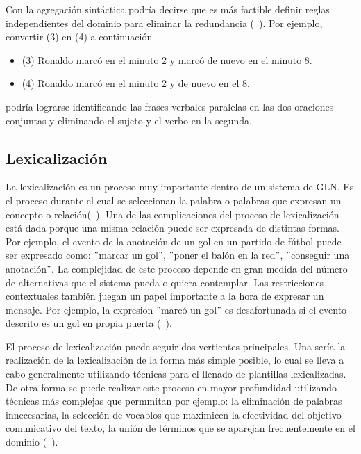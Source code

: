     Con la agregación sintáctica podría decirse que es más factible definir reglas independientes del dominio para eliminar la 
redundancia (~\cite{Gatt2018SurveyOT}). Por ejemplo, convertir (3) en (4) a continuación

\begin{itemize}
    \item (3) Ronaldo marcó en el minuto 2 y marcó de nuevo en el minuto 8.
    \item (4) Ronaldo marcó en el minuto 2 y de nuevo en el 8.
\end{itemize}
    
podría lograrse identificando las frases verbales paralelas en las dos oraciones conjuntas y eliminando el sujeto y el verbo en la segunda.

\subsection{Lexicalización}\label{subsection:lexicalizacion}

    La lexicalización es un proceso muy importante dentro de un sistema de GLN. Es el proceso durante el cual se 
seleccionan la palabra o palabras que expresan un concepto o relaci\'on(~\cite{Reiter1997BuildingAN}). Una de las 
complicaciones del proceso de lexicalización est\'a dada porque una misma relación puede ser expresada de 
distintas formas. Por ejemplo, el evento de la anotación de un gol en un partido de fútbol puede ser expresado como:
¨marcar un gol¨, ¨poner el balón en la red¨, ¨conseguir una anotación¨. La complejidad de este proceso depende en gran 
medida del número de alternativas que el sistema pueda o quiera contemplar. Las restricciones contextuales también juegan 
un papel importante a la hora de expresar un mensaje. Por ejemplo, la expresion ¨marcó un gol¨ es desafortunada si el evento 
descrito es un gol en propia puerta (~\cite{Gatt2018SurveyOT}).

    El proceso de lexicalización puede seguir dos vertientes principales. Una ser\'ia la realizaci\'on de la  
lexicalización de la forma m\'as simple posible, lo cual se lleva a cabo generalmente utilizando t\'ecnicas para el llenado de 
plantillas lexicalizadas. De otra forma se puede realizar este proceso en mayor profundidad utilizando t\'ecnicas m\'as complejas  
que permmitan por ejemplo: la eliminaci\'on de palabras innecesarias, la selección de vocablos que maximicen la efectividad del objetivo 
comunicativo del texto, la uni\'on de t\'erminos que se aparejan frecuentemente en el dominio (~\cite{Perera2017RecentAI}).

